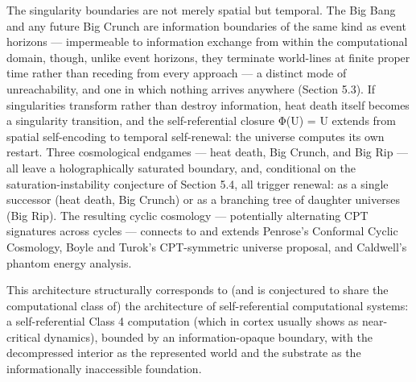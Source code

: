 \documentclass[
]{article}
\begin{document}
The singularity boundaries are not merely spatial but temporal. The Big
Bang and any future Big Crunch are information boundaries of the same
kind as event horizons --- impermeable to information exchange from
within the computational domain, though, unlike event horizons, they
terminate world-lines at finite proper time rather than receding from
every approach --- a distinct mode of unreachability, and one in which
nothing arrives anywhere (Section 5.3). If singularities transform
rather than destroy information, heat death itself becomes a singularity
transition, and the self-referential closure Φ(U) = U extends from
spatial self-encoding to temporal self-renewal: the universe computes
its own restart. Three cosmological endgames --- heat death, Big Crunch,
and Big Rip --- all leave a holographically saturated boundary, and,
conditional on the saturation-instability conjecture of Section 5.4, all
trigger renewal: as a single successor (heat death, Big Crunch) or as a
branching tree of daughter universes (Big Rip). The resulting cyclic
cosmology --- potentially alternating CPT signatures across cycles ---
connects to and extends Penrose's Conformal Cyclic Cosmology, Boyle and
Turok's CPT-symmetric universe proposal, and Caldwell's phantom energy
analysis.

This architecture structurally corresponds to (and is conjectured to
share the computational class of) the architecture of self-referential
computational systems: a self-referential Class 4 computation (which in
cortex usually shows as near-critical dynamics), bounded by an
information-opaque boundary, with the decompressed interior as the
represented world and the substrate as the informationally inaccessible
foundation.
\end{document}
